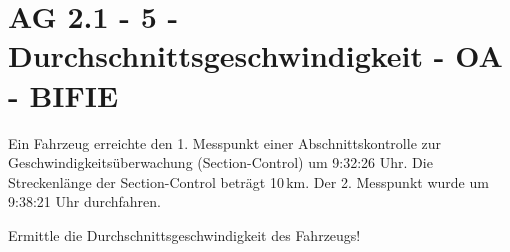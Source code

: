 \section{AG 2.1 - 5 - Durchschnittsgeschwindigkeit - OA - BIFIE}

\begin{beispiel}[AG 2.1]{1} %
Ein Fahrzeug erreichte den 1. Messpunkt einer Abschnittskontrolle zur Geschwindigkeitsüberwachung (Section-Control) um 9:32:26 Uhr. Die Streckenlänge der Section-Control beträgt
10\,km. Der 2. Messpunkt wurde um 9:38:21 Uhr durchfahren.

Ermittle die Durchschnittsgeschwindigkeit des Fahrzeugs!

\end{beispiel}